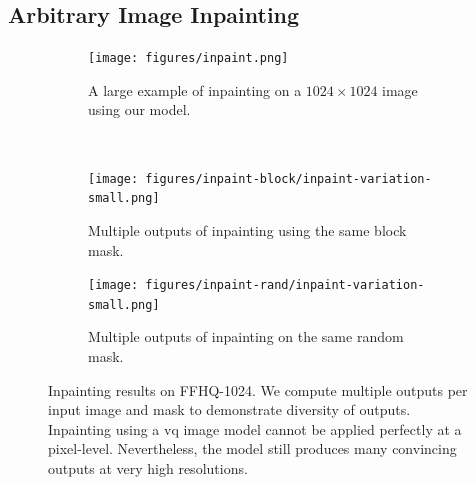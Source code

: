 
\subsection{Arbitrary Image Inpainting}
\label{subsec:evaluationInpainting}

\begin{figure}[ht]
    \centering
    \begin{subfigure}[b]{\textwidth}
        \centering
        \label{fig:inpaintExample}
        \texttt{[image: figures/inpaint.png]}
        \caption{A large example of inpainting on a $1024 \times 1024$ image using our
        model.}
    \end{subfigure}
    \\
    \begin{subfigure}[b]{0.47\textwidth}
        \centering
        \texttt{[image: figures/inpaint-block/inpaint-variation-small.png]}
        \caption{
            Multiple outputs of inpainting using the same block mask.
        }
    \end{subfigure}
    \hfill
    \begin{subfigure}[b]{0.47\textwidth}
        \centering
        \texttt{[image: figures/inpaint-rand/inpaint-variation-small.png]}
        \caption{
            Multiple outputs of inpainting on the same random mask. 
        }
    \end{subfigure}
    \caption{
        Inpainting results on FFHQ-1024. We compute multiple outputs per
        input image and mask to demonstrate diversity of outputs. Inpainting
        using a \gls{vq} image model cannot be applied perfectly at a
        pixel-level. Nevertheless, the model still produces many convincing
        outputs at very high resolutions.
    }
\end{figure}


